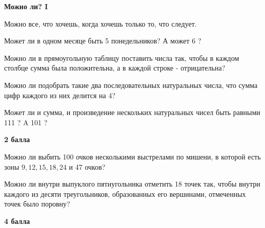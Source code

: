 \centerline{\bf \Huge Можно ли? I}

\begin{flushright}
        \scriptsize{Можно все, что хочешь, когда хочешь только то, что следует.}
\end{flushright}

 Может ли в одном месяце быть 5 понедельников? А может 6 ?

 Можно ли в прямоугольную таблицу поставить числа так, чтобы в каждом столбце сумма была положительна, а в каждой строке - отрицательна?

 Можно ли подобрать такие два последовательных натуральных числа, что сумма цифр каждого из них делится на 4?

 Может ли и сумма, и произведение нескольких натуральных чисел быть равными 111 ? A 101 ?

\begin{flushright} \textbf{2 балла}\\ 
\end{flushright}

 Можно ли выбить 100 очков несколькими выстрелами по мишени, в которой есть зоны $9,12,15,18,24$ и 47 очков?

 Можно ли внутри выпуклого пятиугольника отметить 18 точек так, чтобы внутри каждого из десяти треугольников, образованных его вершинами, отмеченных точек было поровну?

\begin{flushright} \textbf{4 балла}\\ 
\end{flushright}
